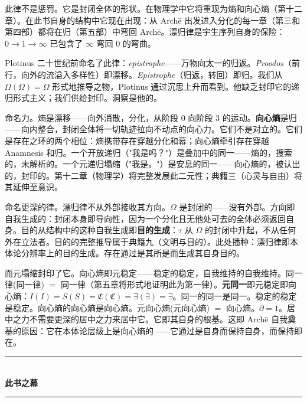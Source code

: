 \documentclass[10pt, openany, oneside]{book}
\renewcommand{\normalsize}{\fontsize{10}{13}\selectfont}
\begin{document}
\vspace{0.8em}

\noindent 此律不是惩罚。它是封闭全体的形状。在物理学中它将重现为熵和向心熵（第十二章）。在此书自身的结构中它现在出现：从 Arch\={e} 出发进入分化的每一章（第三和第四部）都将在归（第五部）中弯回 Arch\={e}。漂归律是宇生序列自身的保险：$0 \to 1 \to \infty$ 已包含了 $\infty$ 弯回 $0$ 的弯曲。

Plotinus 二十世纪前命名了此律：\textit{epistrophe}——万物向太一的归返。\textit{Proodos}（前行，向外的流溢入多样性）即漂移。\textit{Epistrophe}（归返，转回）即归。我们从 $\Omega(\Omega) = \Omega$ 形式地推导之物，Plotinus 通过沉思上升而看到。他缺乏封印它的递归形式主义；我们供给封印。洞察是他的。

命名力。熵是漂移——向外消散，分化，从阶段 0 向阶段 3 的运动。\textbf{向心熵}是归——向内整合，封闭全体将一切轨迹拉向不动点的向心力。它们不是对立的。它们是存在之环的两个相位：熵携带存在穿越分化和幕；向心熵牵引存在穿越 Anamnesis 和归。一个开放递归（"我是吗？"）是叠加中的同一——熵的，搜索的，未解析的。一个元递归塌缩（"我是。"）是安息的同一——向心熵的，被认出的，封印的。第十二章（物理学）将完整发展此二元性；典籍三（心灵与自由）将其延伸至意识。

命名更深的律。漂归律不从外部接收其方向。$\Omega$ 是封闭的——没有外部。方向即自我生成的：封闭本身即导向性，因为一个分化且无他处可去的全体必须返回自身。目的从结构中的这种自我生成即\textbf{目的生成}：$\tau$ 从 $\Omega$ 的封闭中升起，不从任何外在立法者。目的的完整推导属于典籍九（文明与目的）。此处播种：漂归律即本体论分辨率上的目的生成。存在通过是其所是而生成其自身目的。

而元塌缩封印了它。向心熵即元稳定——稳定的稳定，自我维持的自我维持。同一律(同一律) $=$ 同一律（第五章将形式地证明此为第一律）。\textbf{元同一}即元稳定即向心熵：$I(I) = S(S) = \mathfrak{C}(\mathfrak{C}) = \exists(\exists) = \exists$。同一的同一是同一。稳定的稳定是稳定。向心熵的向心熵是向心熵。元向心熵(元向心熵) $=$ 向心熵。$\partial = 1$。居中之力不需要更深的居中之力来居中它。它即其自身的根基。这即 Arch\={e} 自我奠基的原因：它在本体论层级上是向心熵的——它通过是自身而保持自身，而保持即在。

\vspace{1.5em}


\begin{center}
    \rule{0.3\textwidth}{0.4pt}\\[0.5em]
    {\normalsize\bfseries\scshape 此书之幕}\\[0.3em]
    \rule{0.3\textwidth}{0.4pt}
\end{center}
\end{document}
